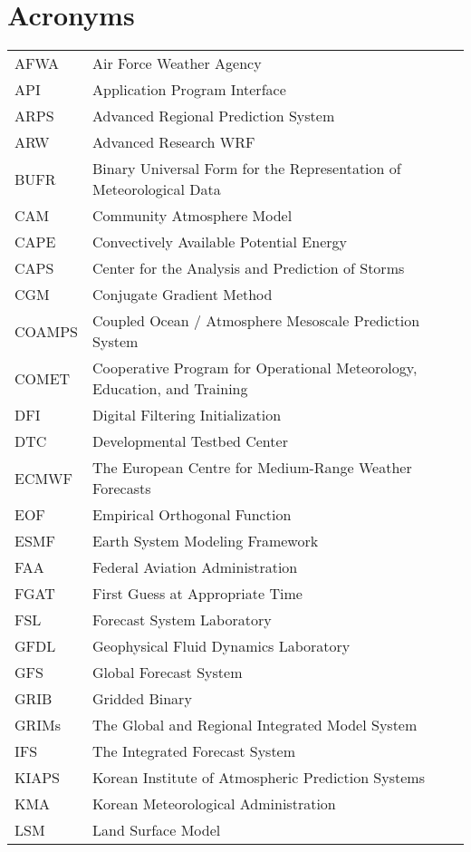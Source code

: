 \chapter{Acronyms}

\begin{tabular}[t]{ll}
AFWA & Air Force Weather Agency \\
API & Application Program Interface \\
ARPS & Advanced Regional Prediction System \\
ARW & Advanced Research WRF \\
BUFR & Binary Universal Form for the Representation of Meteorological Data \\
CAM & Community Atmosphere Model \\
CAPE & Convectively Available Potential Energy \\
CAPS & Center for the Analysis and Prediction of Storms \\
CGM & Conjugate Gradient Method \\
COAMPS & Coupled Ocean / Atmosphere Mesoscale Prediction System \\
COMET & Cooperative Program for Operational Meteorology, Education, and Training \\
DFI & Digital Filtering Initialization \\
DTC & Developmental Testbed Center \\
ECMWF & The European Centre for Medium-Range Weather Forecasts \\
EOF & Empirical Orthogonal Function \\
ESMF & Earth System Modeling Framework \\
FAA & Federal Aviation Administration \\
FGAT & First Guess at Appropriate Time \\
FSL & Forecast System Laboratory \\
GFDL & Geophysical Fluid Dynamics Laboratory \\
GFS & Global Forecast System \\
GRIB & Gridded Binary \\
GRIMs & The Global and Regional Integrated Model System \\
IFS & The Integrated Forecast System \\
KIAPS & Korean Institute of Atmospheric Prediction Systems \\
KMA & Korean Meteorological Administration \\
LSM & Land Surface Model \\

\end{tabular}
